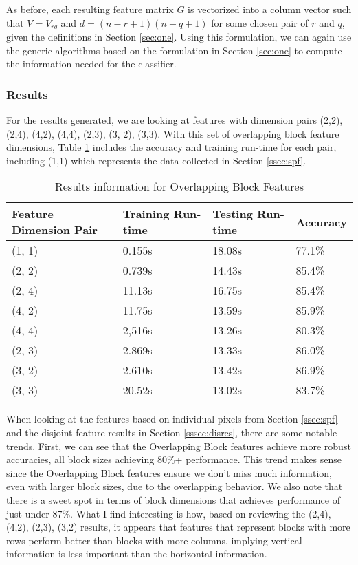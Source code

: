 \documentclass{article}[12pt]
\begin{document}
   As before, each resulting feature matrix $G$ is vectorized into a column vector such that $V = V_{rq} $ and $d = (n-r+1)(n-q+1)$ for some chosen pair of $r$ and $q$, given the definitions in Section \ref{sec:one}. Using this formulation, we can again use the generic algorithms based on the formulation in Section \ref{sec:one} to compute the information needed for the classifier.
   
   \subsubsection{Results}
   For the results generated, we are looking at features with dimension pairs (2,2), (2,4), (4,2), (4,4), (2,3), (3, 2), (3,3). With this set of overlapping block feature dimensions, Table \ref{tab:ovr} includes the accuracy and training run-time for each pair, including (1,1) which represents the data collected in Section \ref{ssec:spf}.
   
   \begin{table}[ht]
   	\centering
   	\begin{tabular}{l | l | l | l}
   		\hline
   		Feature Dimension Pair & Training Run-time & Testing Run-time & Accuracy  \\
   		\hline \hline 
   		(1, 1) & 0.155s & 18.08s &77.1\% \\
   		(2, 2) & 0.739s & 14.43s & 85.4\% \\
   		(2, 4) & 11.13s & 16.75s & 85.4\% \\
   		(4, 2) & 11.75s & 13.59s & 85.9\% \\
   		(4, 4) & 2,516s & 13.26s & 80.3\% \\
   		(2, 3) & 2.869s & 13.33s & 86.0\% \\
   		(3, 2) & 2.610s & 13.42s & 86.9\% \\
   		(3, 3) & 20.52s & 13.02s & 83.7\% \\
   		\hline
   	\end{tabular}
   	\caption{Results information for Overlapping Block Features} \label{tab:ovr}
   \end{table}
   
   When looking at the features based on individual pixels from Section \ref{ssec:spf} and the disjoint feature results in Section \ref{sssec:disres}, there are some notable trends. First, we can see that the Overlapping Block features achieve more robust accuracies, all block sizes achieving 80\%+ performance. This trend makes sense since the Overlapping Block features ensure we don't miss much information, even with larger block sizes, due to the overlapping behavior. We also note that there is a sweet spot in terms of block dimensions that achieves performance of just under 87\%. What I find interesting is how, based on reviewing the (2,4), (4,2), (2,3), (3,2) results, it appears that features that represent blocks with more rows perform better than blocks with more columns, implying vertical information is less important than the horizontal information.
   
\end{document}
